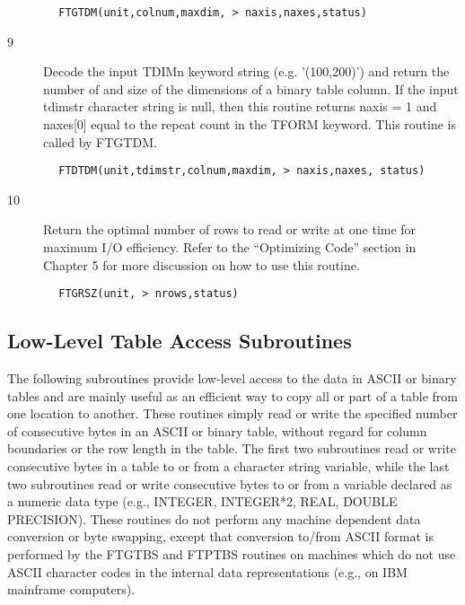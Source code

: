 \documentclass[11pt]{book}
\begin{document}
\begin{verbatim}
        FTGTDM(unit,colnum,maxdim, > naxis,naxes,status)
\end{verbatim}

\begin{description}
\item[9 ] Decode the input TDIMn keyword string (e.g. '(100,200)') and return the
    number of and size of the dimensions of a binary table column. If the input
    tdimstr character string is null, then this routine returns naxis = 1
    and naxes[0] equal to the repeat count in the TFORM keyword. This routine
   is called by FTGTDM.
\end{description}

\begin{verbatim}
        FTDTDM(unit,tdimstr,colnum,maxdim, > naxis,naxes, status)
\end{verbatim}

\begin{description}
\item[10]  Return the optimal number of rows to read or write at one time for
    maximum I/O efficiency.  Refer to the ``Optimizing Code'' section
   in Chapter 5 for more discussion on how to use this routine.
\end{description}


\begin{verbatim}
        FTGRSZ(unit, > nrows,status)
\end{verbatim}


\subsection{Low-Level Table Access Subroutines \label{FTGTBS}}

The following subroutines provide low-level access to the data in ASCII
or binary tables and are mainly useful as an efficient way to copy all
or part of a table from one location to another.  These routines simply
read or write the specified number of consecutive bytes in an ASCII or
binary table, without regard for column boundaries or the row length in
the table.  The first two subroutines read or write consecutive bytes
in a table to or from a character string variable, while the last two
subroutines read or write consecutive bytes to or from a variable
declared as a numeric data type (e.g., INTEGER, INTEGER*2, REAL, DOUBLE
PRECISION).  These routines do not perform any machine dependent data
conversion or byte swapping, except that conversion to/from ASCII
format is performed by the FTGTBS and FTPTBS routines on machines which
do not use ASCII character codes in the internal data representations
(e.g., on IBM mainframe computers).
\end{document}
